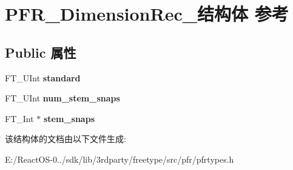 \hypertarget{struct_p_f_r___dimension_rec__}{}\section{P\+F\+R\+\_\+\+Dimension\+Rec\+\_\+结构体 参考}
\label{struct_p_f_r___dimension_rec__}
\subsection*{Public 属性}
\begin{DoxyCompactItemize}
\item 
\mbox{\label{struct_p_f_r___dimension_rec___ac1a5ce51d40ecc9b976c4d654ded6ef7}} 
F\+T\+\_\+\+U\+Int {\bfseries standard}
\item 
\mbox{\label{struct_p_f_r___dimension_rec___a66d7e73d886eba1963cefbcaaa53998b}} 
F\+T\+\_\+\+U\+Int {\bfseries num\+\_\+stem\+\_\+snaps}
\item 
\mbox{\label{struct_p_f_r___dimension_rec___ac3bc5c72b9a9320c5f77bf266df71ec3}} 
F\+T\+\_\+\+Int $\ast$ {\bfseries stem\+\_\+snaps}
\end{DoxyCompactItemize}


该结构体的文档由以下文件生成\+:\begin{DoxyCompactItemize}
\item 
E\+:/\+React\+O\+S-\/0../sdk/lib/3rdparty/freetype/src/pfr/pfrtypes.\+h\end{DoxyCompactItemize}
